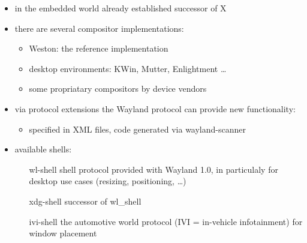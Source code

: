 \documentclass[ucs,9pt]{beamer}
\begin{document}
\begin{frame}
    \begin{itemize}
        \item in the embedded world already established successor of X
        \item there are several compositor implementations:
            \begin{itemize}
                \item Weston: the reference implementation
                \item desktop environments: KWin, Mutter, Enlightment \dots
                \item some propriatary compositors by device vendors
            \end{itemize}
        \item via protocol extensions the Wayland protocol can provide new functionality:
            \begin{itemize}
                \item specified in XML files, code generated via wayland-scanner
            \end{itemize}
        \item available shells:
            \begin{itemize}
                \item [wl-shell] shell protocol provided with Wayland 1.0, in particulaly for desktop use cases (resizing, positioning, \dots)
                \item [xdg-shell] successor of wl\_shell
                \item [ivi-shell] the automotive world protocol (IVI = in-vehicle infotainment) for window placement
            \end{itemize}
    \end{itemize}
\end{frame}
\end{document}
